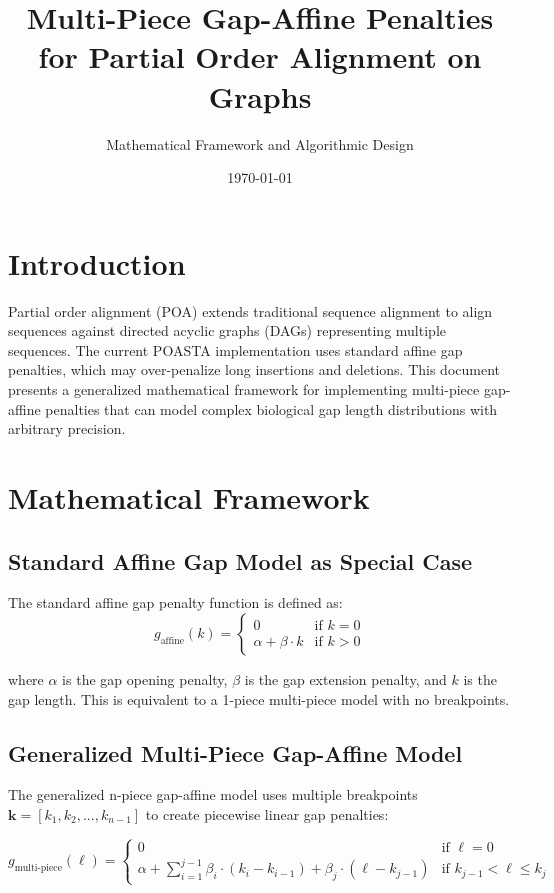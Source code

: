 \documentclass[11pt]{article}
\title{Multi-Piece Gap-Affine Penalties for Partial Order Alignment on Graphs}
\author{Mathematical Framework and Algorithmic Design}
\date{\today}
\begin{document}
\maketitle

\section{Introduction}

Partial order alignment (POA) extends traditional sequence alignment to align sequences against directed acyclic graphs (DAGs) representing multiple sequences. The current POASTA implementation uses standard affine gap penalties, which may over-penalize long insertions and deletions. This document presents a generalized mathematical framework for implementing multi-piece gap-affine penalties that can model complex biological gap length distributions with arbitrary precision.

\section{Mathematical Framework}

\subsection{Standard Affine Gap Model as Special Case}

The standard affine gap penalty function is defined as:
\begin{equation}
g_{\text{affine}}(k) = \begin{cases} 
0 & \text{if } k = 0 \\
\alpha + \beta \cdot k & \text{if } k > 0
\end{cases}
\end{equation}

where $\alpha$ is the gap opening penalty, $\beta$ is the gap extension penalty, and $k$ is the gap length. This is equivalent to a 1-piece multi-piece model with no breakpoints.

\subsection{Generalized Multi-Piece Gap-Affine Model}

The generalized n-piece gap-affine model uses multiple breakpoints $\mathbf{k} = [k_1, k_2, ..., k_{n-1}]$ to create piecewise linear gap penalties:

\begin{equation}
g_{\text{multi-piece}}(\ell) = \begin{cases}
0 & \text{if } \ell = 0 \\
\alpha + \sum_{i=1}^{j-1} \beta_i \cdot (k_i - k_{i-1}) + \beta_j \cdot (\ell - k_{j-1}) & \text{if } k_{j-1} < \ell \leq k_j
\end{cases}
\end{equation}
\end{document}
